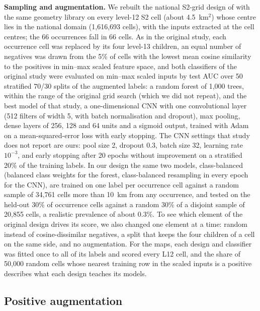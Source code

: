 \documentclass[pdflatex,sn-apa]{sn-jnl}
\begin{document}
\textbf{Sampling and augmentation.} We rebuilt the national S2-grid design of \citet{Parsa2024} with the same geometry library on every level-12 S2 cell (about 4.5~km$^2$) whose centre lies in the national domain (1,616,693 cells), with the inputs extracted at the cell centres; the 66 occurrences fall in 66 cells. As in the original study, each occurrence cell was replaced by its four level-13 children, an equal number of negatives was drawn from the 5\% of cells with the lowest mean cosine similarity to the positives in min--max scaled feature space, and both classifiers of the original study were evaluated on min--max scaled inputs by test AUC over 50 stratified 70/30 splits of the augmented labels: a random forest of 1,000 trees, within the range of the original grid search (which we did not repeat), and the best model of that study, a one-dimensional CNN with one convolutional layer (512 filters of width 5, with batch normalisation and dropout), max pooling, dense layers of 256, 128 and 64 units and a sigmoid output, trained with Adam on a mean-squared-error loss with early stopping. The CNN settings that study does not report are ours: pool size 2, dropout 0.3, batch size 32, learning rate $10^{-3}$, and early stopping after 20 epochs without improvement on a stratified 20\% of the training labels. In our design the same two models, class-balanced (balanced class weights for the forest, class-balanced resampling in every epoch for the CNN), are trained on one label per occurrence cell against a random sample of 34,761 cells more than 10~km from any occurrence, and tested on the held-out 30\% of occurrence cells against a random 30\% of a disjoint sample of 20,855 cells, a realistic prevalence of about 0.3\%. To see which element of the original design drives its score, we also changed one element at a time: random instead of cosine-dissimilar negatives, a split that keeps the four children of a cell on the same side, and no augmentation. For the maps, each design and classifier was fitted once to all of its labels and scored every L12 cell, and the share of 50,000 random cells whose nearest training row in the scaled inputs is a positive describes what each design teaches its models.


\subsection{Positive augmentation}\label{sec:augmentation}
\end{document}
